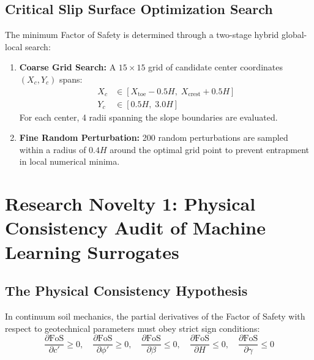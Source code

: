 \documentclass[12pt,a4paper,oneside]{report}
\begin{document}
\section{Critical Slip Surface Optimization Search}
The minimum Factor of Safety is determined through a two-stage hybrid global-local search:
\begin{enumerate}
  \item \textbf{Coarse Grid Search:} A $15 \times 15$ grid of candidate center coordinates $(X_c, Y_c)$ spans:
  \begin{align}
    X_c &\in [X_{\text{toe}} - 0.5H, \; X_{\text{crest}} + 0.5H] \\
    Y_c &\in [0.5H, \; 3.0H]
  \end{align}
  For each center, 4 radii spanning the slope boundaries are evaluated.
  \item \textbf{Fine Random Perturbation:} 200 random perturbations are sampled within a radius of $0.4H$ around the optimal grid point to prevent entrapment in local numerical minima.
\end{enumerate}

\chapter{Research Novelty 1: Physical Consistency Audit of Machine Learning Surrogates}

\section{The Physical Consistency Hypothesis}
In continuum soil mechanics, the partial derivatives of the Factor of Safety with respect to geotechnical parameters must obey strict sign conditions:
\begin{equation}
  \frac{\partial \text{FoS}}{\partial c'} \ge 0, \quad
  \frac{\partial \text{FoS}}{\partial \phi'} \ge 0, \quad
  \frac{\partial \text{FoS}}{\partial \beta} \le 0, \quad
  \frac{\partial \text{FoS}}{\partial H} \le 0, \quad
  \frac{\partial \text{FoS}}{\partial \gamma} \le 0
\end{equation}
\end{document}
